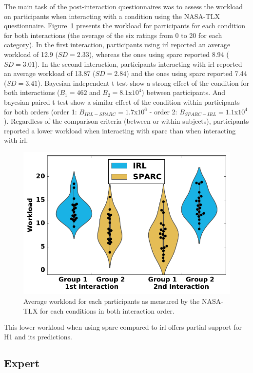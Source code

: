 The main task of the post-interaction questionnaires was to assess the workload on participants when interacting with a condition using the NASA-TLX questionnaire. Figure~\ref{fig:control_workload} presents the workload for participants for each condition for both interactions (the average of the six ratings from 0 to 20 for each category). In the first interaction, participants using \gls{irl} reported an average workload of 12.9 ($SD=2.33$), whereas the ones using \gls{sparc} reported 8.94 ($SD=3.01$). In the second interaction, participants interacting with \gls{irl} reported an average workload of 13.87 ($SD=2.84$) and the ones using \gls{sparc} reported 7.44 ($SD=3.41$). Bayesian independent t-test show a strong effect of the condition for both interactions ($B_1=462$ and $B_2=8.1$x$10^4$) between participants. And bayesian paired t-test show a similar effect of the condition within participants for both orders (order 1: $B_{IRL-SPARC}=1.7$x$10^6$ - order 2: $B_{SPARC-IRL}=1.1$x$10^4$). Regardless of the comparison criteria (between or within subjects), participants reported a lower workload when interacting with \gls{sparc} than when interacting with \gls{irl}.

\begin{figure}[ht]
	\includegraphics[width=.5\textwidth]{workload.pdf}
	\centering
	\caption{Average workload for each participants as measured by the NASA-TLX for each conditions in both interaction order.
	}
	\label{fig:control_workload}
\end{figure}

This lower workload when using \gls{sparc} compared to \gls{irl} offers partial support for H1 and its predictions.

\subsection{Expert} \label{ssec:control_expert}

